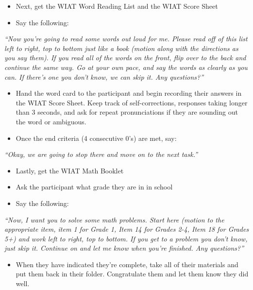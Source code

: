 \documentclass[]{book}
\providecommand{\tightlist}{%
  \setlength{\itemsep}{0pt}\setlength{\parskip}{0pt}}
\begin{document}
\begin{itemize}
\tightlist
\item
  Next, get the WIAT Word Reading List and the WIAT Score Sheet
\item
  Say the following:
\end{itemize}

\emph{``Now you're going to read some words out loud for me. Please read off of this list left to right, top to bottom just like a book (motion along with the directions as you say them). If you read all of the words on the front, flip over to the back and continue the same way. Go at your own pace, and say the words as clearly as you can. If there's one you don't know, we can skip it. Any questions?''}

\begin{itemize}
\tightlist
\item
  Hand the word card to the participant and begin recording their answers in the WIAT Score Sheet. Keep track of self-corrections, responses taking longer than 3 seconds, and ask for repeat pronunciations if they are sounding out the word or ambiguous.
\item
  Once the end criteria (4 consecutive 0's) are met, say:
\end{itemize}

\emph{``Okay, we are going to stop there and move on to the next task.''}

\begin{itemize}
\tightlist
\item
  Lastly, get the WIAT Math Booklet
\item
  Ask the participant what grade they are in in school
\item
  Say the following:
\end{itemize}

\emph{``Now, I want you to solve some math problems. Start here (motion to the appropriate item, item 1 for Grade 1, Item 14 for Grades 2-4, Item 18 for Grades 5+) and work left to right, top to bottom. If you get to a problem you don't know, just skip it. Continue on and let me know when you're finished. Any questions?''}

\begin{itemize}
\tightlist
\item
  When they have indicated they're complete, take all of their materials and put them back in their folder. Congratulate them and let them know they did well.
\end{itemize}
\end{document}

